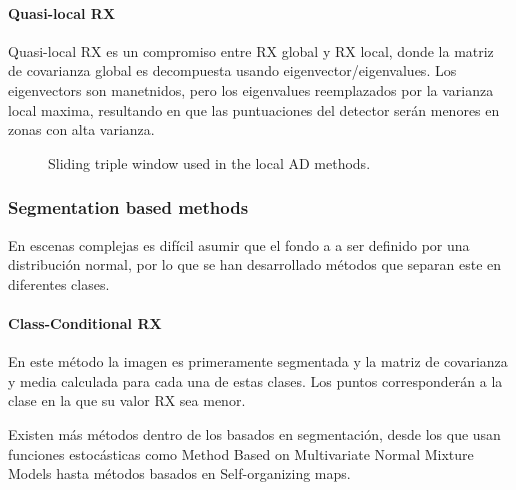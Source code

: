 \paragraph{Quasi-local RX}
Quasi-local RX es un compromiso entre RX global y RX local, donde la matriz de covarianza global es decompuesta usando eigenvector/eigenvalues. Los eigenvectors son manetnidos, pero los eigenvalues reemplazados por la varianza local maxima, resultando en que las puntuaciones del detector serán menores en zonas con alta varianza.

\begin{figure}[h!]
\centering
\hspace*{100pt}%
\caption{Sliding triple window used in the local AD methods.}
  \label{fig:ventana}
\end{figure}

\subsubsection{Segmentation based methods}
En escenas complejas es difícil asumir que el fondo a a ser definido por una  distribución normal, por lo que se han desarrollado métodos que separan este en diferentes clases.
\paragraph{Class-Conditional RX}
En este método la imagen es primeramente segmentada y la matriz de covarianza y media calculada para cada una de estas clases. Los puntos corresponderán a la clase en la que su valor RX sea menor.

Existen más métodos dentro de los basados en segmentación, desde los que usan funciones estocásticas como Method Based on Multivariate Normal Mixture Models hasta métodos basados en Self-organizing maps.



